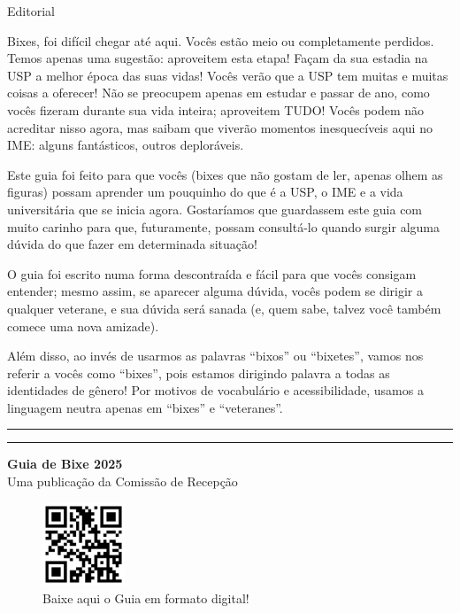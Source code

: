 \begin{editorial}{Editorial}

Bixes, foi difícil chegar até aqui. Vocês
estão meio ou completamente perdidos. Temos apenas uma sugestão: aproveitem esta
etapa! Façam da sua estadia na USP a melhor época das suas vidas! Vocês verão
que a USP tem muitas e muitas coisas a oferecer! Não se preocupem apenas em
estudar e passar de ano, como vocês fizeram durante sua vida inteira; aproveitem
TUDO! Vocês podem não acreditar nisso agora, mas saibam que viverão momentos
inesquecíveis aqui no IME: alguns fantásticos, outros deploráveis.

Este guia foi feito para que vocês (bixes que não gostam de ler, apenas olhem as figuras)
possam aprender um pouquinho do que é a USP,
o IME e a vida universitária que se inicia agora. 
Gostaríamos que guardassem este guia com muito carinho para que, futuramente, possam consultá-lo
quando surgir alguma dúvida do que fazer em determinada situação!

O guia foi escrito numa forma
descontraída e fácil para que vocês consigam entender; mesmo assim, se aparecer
alguma dúvida, vocês podem se dirigir a qualquer veterane, e sua dúvida será
sanada (e, quem sabe, talvez você também comece uma nova amizade).

Além disso, ao invés de usarmos as palavras ``bixos'' ou ``bixetes'', vamos nos referir
a vocês como ``bixes'', pois estamos dirigindo palavra a todas as identidades de 
gênero! Por motivos de vocabulário e acessibilidade, usamos a linguagem neutra 
apenas em ``bixes'' e ``veteranes''.


\rule{\textwidth}{0.5ex}\rule{2ex}{0.5ex}

{\large\bf Guia de Bixe 2025} \\
Uma publicação da Comissão de Recepção


\begin{figure}

  \begin{center}
    \includegraphics[width=0.22\textwidth]{img/qrcodeguia2024.png}
  \end{center}
  \vspace{-20pt}
  \caption{Baixe aqui o Guia em formato digital!}
  \vspace{80pt}
\end{figure} 


\end{editorial}
